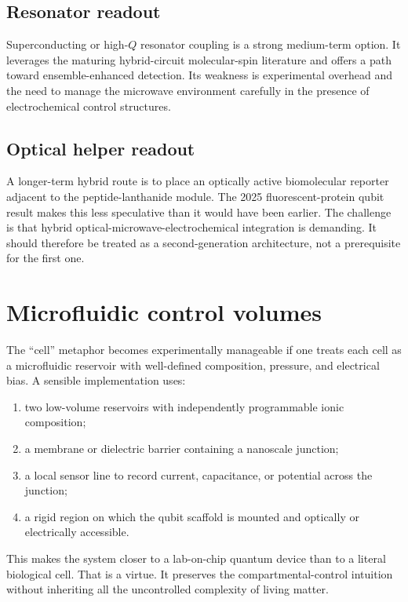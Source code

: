 \documentclass[11pt]{report}
\theoremstyle{definition}
\begin{document}
\subsection{Resonator readout}
Superconducting or high-$Q$ resonator coupling is a strong medium-term option. It leverages the maturing hybrid-circuit molecular-spin literature and offers a path toward ensemble-enhanced detection. Its weakness is experimental overhead and the need to manage the microwave environment carefully in the presence of electrochemical control structures.

\subsection{Optical helper readout}
A longer-term hybrid route is to place an optically active biomolecular reporter adjacent to the peptide-lanthanide module. The 2025 fluorescent-protein qubit result makes this less speculative than it would have been earlier. The challenge is that hybrid optical-microwave-electrochemical integration is demanding. It should therefore be treated as a second-generation architecture, not a prerequisite for the first one.

\section{Microfluidic control volumes}
The ``cell'' metaphor becomes experimentally manageable if one treats each cell as a microfluidic reservoir with well-defined composition, pressure, and electrical bias. A sensible implementation uses:

\begin{enumerate}[leftmargin=2em]
\item two low-volume reservoirs with independently programmable ionic composition;
\item a membrane or dielectric barrier containing a nanoscale junction;
\item a local sensor line to record current, capacitance, or potential across the junction;
\item a rigid region on which the qubit scaffold is mounted and optically or electrically accessible.
\end{enumerate}

This makes the system closer to a lab-on-chip quantum device than to a literal biological cell. That is a virtue. It preserves the compartmental-control intuition without inheriting all the uncontrolled complexity of living matter.
\end{document}
